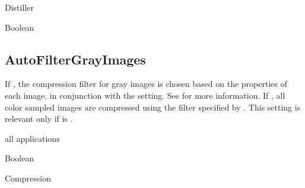 \documentclass[letterpaper,12pt,english,openany,oneside]{sphinxmanual}
\begin{document}
\label{\detokenize{PDF_Create_CommonSettings:supported-by-36}}

Distiller

\label{\detokenize{PDF_Create_CommonSettings:type-36}}

Boolean

\label{\detokenize{PDF_Create_CommonSettings:default-value-33}}

\begin{sphinxVerbatim}[commandchars=\\\{\}]
\end{sphinxVerbatim}




\subsection{AutoFilterGrayImages}
\label{\detokenize{PDF_Create_CommonSettings:autofiltergrayimages}}
If  , the compression filter for gray images is chosen based on the properties of each image, in conjunction with the  setting. See  for more information. If  , all color sampled images are compressed using the filter specified by  . This setting is relevant only if  is  .

\label{\detokenize{PDF_Create_CommonSettings:supported-by-37}}

all applications

\label{\detokenize{PDF_Create_CommonSettings:type-37}}

Boolean

\label{\detokenize{PDF_Create_CommonSettings:ui-name-27}}

Compression

\label{\detokenize{PDF_Create_CommonSettings:default-value-34}}

\begin{sphinxVerbatim}[commandchars=\\\{\}]
\end{sphinxVerbatim}
\end{document}
